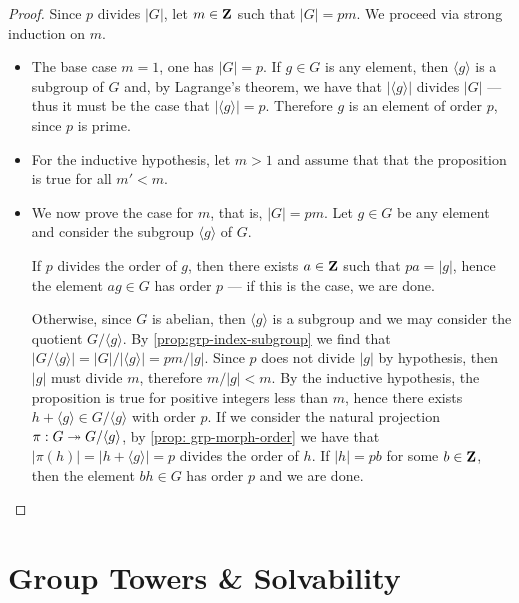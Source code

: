 \begin{proof}
Since \(p\) divides \(|G|\), let \(m \in \mathbf{Z}\) such that \(|G| = p m\). We
proceed via strong induction on \(m\).
\begin{itemize}\setlength\itemsep{0em}
\item The base case \(m = 1\), one has \(|G| = p\). If \(g \in G\) is any
  element, then \(\langle g \rangle\) is a subgroup of \(G\) and, by Lagrange's
  theorem, we have that \(|\langle g \rangle|\) divides \(|G|\) --- thus it must
  be the case that \(|\langle g \rangle| = p\). Therefore \(g\) is an element of
  order \(p\), since \(p\) is prime.
\item For the inductive hypothesis, let \(m > 1\) and assume that that the
  proposition is true for all \(m' < m\).
\item We now prove the case for \(m\), that is, \(|G| = p m\). Let \(g \in G\)
  be any element and consider the subgroup \(\langle g \rangle\) of
  \(G\).

  If \(p\) divides the order of \(g\), then there exists \(a
  \in \mathbf{Z}\) such that \(p a = |g|\), hence the element \(a g \in G\) has order
  \(p\) --- if this is the case, we are done.

  Otherwise, since \(G\) is abelian, then \(\langle g \rangle\) is a subgroup
  and we may consider the quotient \(G/{\langle g \rangle}\). By
  \cref{prop:grp-index-subgroup} we find that
  \(|G/{\langle g \rangle}| = |G|/{|\langle g \rangle|} = p m / |g|\). Since
  \(p\) does not divide \(|g|\) by hypothesis, then \(|g|\) must divide \(m\),
  therefore \(m/|g| < m\). By the inductive hypothesis, the proposition is true
  for positive integers less than \(m\), hence there exists
  \(h + \langle g \rangle \in G/{\langle g \rangle}\) with order \(p\). If we
  consider the natural projection \(\pi: G \twoheadrightarrow G/{\langle g \rangle}\), by
  \cref{prop: grp-morph-order} we have that
  \(|\pi(h)| = |h + \langle g \rangle| = p\) divides the order of \(h\). If
  \(|h| = p b\) for some \(b \in \mathbf{Z}\), then the element \(b h \in G\) has order
  \(p\) and we are done.
\end{itemize}
\end{proof}


\section{Group Towers \& Solvability}

